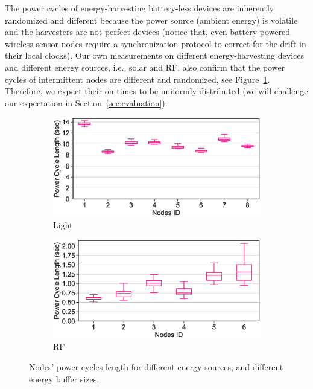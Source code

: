 The power cycles of energy-harvesting battery-less devices are inherently randomized and different because the power source (ambient energy) is volatile and the harvesters are not perfect devices (notice that, even battery-powered wireless sensor nodes require a synchronization protocol to correct for the drift in their local clocks). Our own measurements on different energy-harvesting devices and different energy sources, i.e., solar and RF, also confirm that the power cycles of intermittent nodes are different and randomized, see Figure~\ref{fig:power_cycles}. Therefore, we expect their on-times to be uniformly distributed (we will challenge our expectation in Section~\ref{sec:evaluation}). 
%
\begin{figure}[t]
		\begin{subfigure}{.49\columnwidth}
			\centering
			\includegraphics[width=\textwidth]{figures/light_power_cycles_len}
			\caption{Light}
		\end{subfigure}\hfill
		\begin{subfigure}{.49\columnwidth}
			\centering
			\includegraphics[width=\textwidth]{figures/rf_power_cycles_len}
			\caption{RF}
		\end{subfigure}\hfill
		\caption{Nodes' power cycles length for different energy sources, and different energy buffer sizes.}
		\label{fig:power_cycles}
\end{figure} 
%
